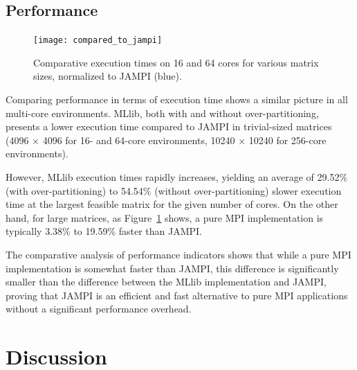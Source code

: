 \documentclass[bdcc,article,submit,moreauthors,pdftex]{Definitions/mdpi}
\begin{document}

\subsection{Performance} %
\label{sub:performance}


\begin{figure}
	\centering
	\texttt{[image: compared\_to\_jampi]}
	\vspace{14pt}
	\caption{Comparative execution times on 16 and 64 cores for various matrix sizes, normalized to JAMPI (blue).}
	\label{fig:comparison_to_jampi}
\end{figure}



Comparing performance in terms of execution time shows a similar picture in all multi-core environments. MLlib, both with and without over-partitioning, presents a lower execution time compared to JAMPI in trivial-sized matrices (4096 $\times$ 4096 for 16- and 64-core environments, 10240 $\times$ 10240 for 256-core environments). 

However, MLlib execution times rapidly increases, yielding an average of 29.52\% (with over-partitioning) to 54.54\% (without over-partitioning) slower execution time at the largest feasible matrix for the given number of cores. On the other hand, for large matrices, as Figure~\ref{fig:comparison_to_jampi} shows, a pure MPI implementation is typically 3.38\% to 19.59\% faster than JAMPI. 

The comparative analysis of performance indicators shows that while a pure MPI implementation is somewhat faster than JAMPI, this difference is significantly smaller than the difference between the MLlib implementation and JAMPI, proving that JAMPI is an efficient and fast alternative to pure MPI applications without a significant performance overhead.





\section{Discussion} %
\label{sec:conclusion}
\end{document}
